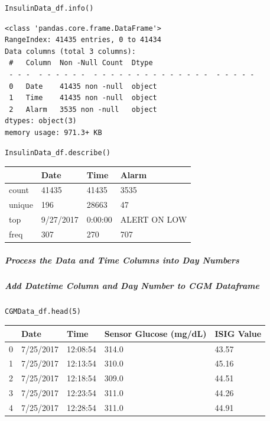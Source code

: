 \begin{verbatim}
InsulinData_df.info()
\end{verbatim}

\begin{verbatim}
<class 'pandas.core.frame.DataFrame'>
RangeIndex: 41435 entries, 0 to 41434
Data columns (total 3 columns):
 #   Column  Non -Null Count  Dtype 
 - - -  - - - - - -  - - - - - - - - - - - - - -  - - - - - 
 0   Date    41435 non -null  object
 1   Time    41435 non -null  object
 2   Alarm   3535 non -null   object
dtypes: object(3)
memory usage: 971.3+ KB
\end{verbatim}

\begin{verbatim}
InsulinData_df.describe()
\end{verbatim}

\bigskip\noindent
\begin{tabular}{p{}p{}p{}p{}}
\toprule
 & Date & Time & Alarm \\
\hline
count & 41435 & 41435 & 3535 \\
\hline
unique & 196 & 28663 & 47 \\
\hline
top & 9/27/2017 & 0:00:00 & ALERT ON LOW \\
\hline
freq & 307 & 270 & 707 \\
\hline
\bottomrule
\end{tabular}

\bigskip

\subparagraph{Process the Data and Time Columns into Day Numbers}

\subparagraph{Add Datetime Column and Day Number to CGM Dataframe}

\begin{verbatim}
CGMData_df.head(5)
\end{verbatim}

\bigskip\noindent
\begin{tabular}{p{}p{}p{}p{}p{}}
\toprule
 & Date & Time & Sensor Glucose (mg/dL) & ISIG Value \\
\hline
0 & 7/25/2017 & 12:08:54 & 314.0 & 43.57 \\
\hline
1 & 7/25/2017 & 12:13:54 & 310.0 & 45.16 \\
\hline
2 & 7/25/2017 & 12:18:54 & 309.0 & 44.51 \\
\hline
3 & 7/25/2017 & 12:23:54 & 311.0 & 44.26 \\
\hline
4 & 7/25/2017 & 12:28:54 & 311.0 & 44.91 \\
\hline
\bottomrule
\end{tabular}

